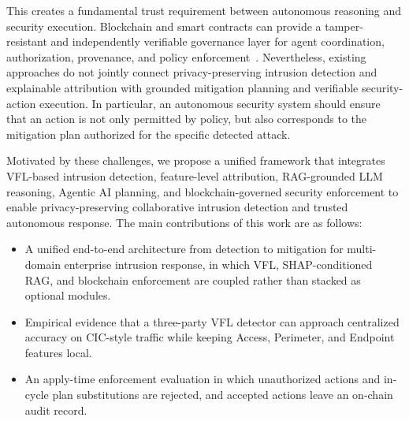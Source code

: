 \documentclass[10pt, conference]{IEEEtran}
\begin{document}
This creates a fundamental trust requirement between autonomous reasoning and security execution. Blockchain and smart contracts can provide a tamper-resistant and independently verifiable governance layer for agent coordination, authorization, provenance, and policy enforcement~\cite{karim2025,chen2024,jin2024,jan2025}. Nevertheless, existing approaches do not jointly connect privacy-preserving intrusion detection and explainable attribution with grounded mitigation planning and verifiable security-action execution. In particular, an autonomous security system should ensure that an action is not only permitted by policy, but also corresponds to the mitigation plan authorized for the specific detected attack.

Motivated by these challenges, we propose a unified framework that integrates VFL-based intrusion detection, feature-level attribution, RAG-grounded LLM reasoning, Agentic AI planning, and blockchain-governed security enforcement to enable privacy-preserving collaborative intrusion detection and trusted autonomous response. The main contributions of this work are as follows:
\begin{itemize}
  \item A unified end-to-end architecture from detection to mitigation for multi-domain enterprise intrusion response, in which VFL,  SHAP-conditioned RAG, and blockchain enforcement are coupled rather than stacked as optional modules.
  \item Empirical evidence that a three-party VFL detector can approach centralized accuracy on CIC-style traffic while keeping Access, Perimeter, and Endpoint features local.
  \item An apply-time enforcement evaluation in which unauthorized actions and in-cycle plan substitutions are rejected, and accepted actions leave an on-chain audit record.
\end{itemize}
\end{document}
